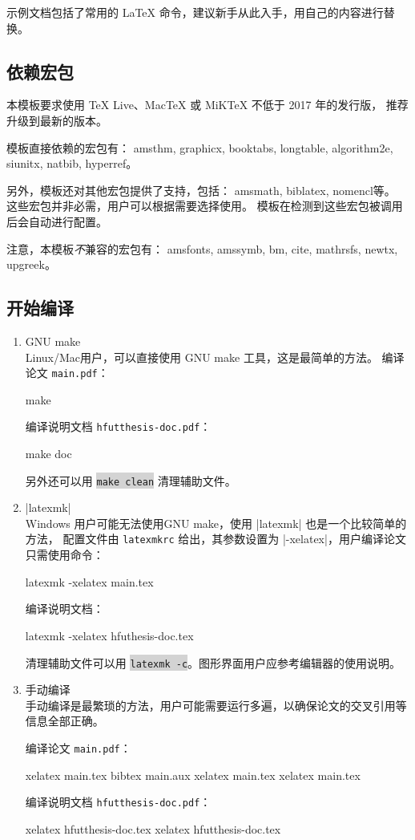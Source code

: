 \documentclass[a4paper]{ltxdoc}
\DeclareRobustCommand\file{\nolinkurl}
\DeclareRobustCommand\pkg{\textsf}
\newcommand\shellcmd[1]{\colorbox{lightgray}{\lstinline[style=lstshell]|#1|}}
\begin{document}
示例文档包括了常用的 \LaTeX{} 命令，建议新手从此入手，用自己的内容进行替换。


\subsection{依赖宏包}

本模板要求使用 TeX Live、MacTeX 或 MiKTeX 不低于 2017 年的发行版，
推荐升级到最新的版本。

模板直接依赖的宏包有：
\pkg{amsthm},
\pkg{graphicx},
\pkg{booktabs},
\pkg{longtable},
\pkg{algorithm2e},
\pkg{siunitx},
\pkg{natbib},
\pkg{hyperref}。

另外，模板还对其他宏包提供了支持，包括：
\pkg{amsmath},
\pkg{biblatex},
\pkg{nomencl}等。
这些宏包并非必需，用户可以根据需要选择使用。
模板在检测到这些宏包被调用后会自动进行配置。

注意，本模板\emph{不}兼容的宏包有：
\pkg{amsfonts},
\pkg{amssymb},
\pkg{bm},
\pkg{cite},
\pkg{mathrsfs},
\pkg{newtx},
\pkg{upgreek}。


\subsection{开始编译}

\begin{enumerate}

\item GNU make \\
Linux/Mac用户，可以直接使用 GNU make 工具，这是最简单的方法。
编译论文 \file{main.pdf}：
\begin{shell}
  make
\end{shell}
编译说明文档 \file{hfutthesis-doc.pdf}：
\begin{shell}
  make doc
\end{shell}
另外还可以用 \shellcmd{make clean} 清理辅助文件。

\item |latexmk| \\
Windows 用户可能无法使用GNU make，使用 |latexmk| 也是一个比较简单的方法，
配置文件由 \file{latexmkrc} 给出，其参数设置为 |-xelatex|，用户编译论文
只需使用命令：
\begin{shell}
  latexmk -xelatex main.tex
\end{shell}
编译说明文档：
\begin{shell}
  latexmk -xelatex hfuthesis-doc.tex
\end{shell}
清理辅助文件可以用 \shellcmd{latexmk -c}。图形界面用户应参考编辑器的使用说明。

\item 手动编译 \\
手动编译是最繁琐的方法，用户可能需要运行多遍，以确保论文的交叉引用等信息全部正确。

编译论文 \file{main.pdf}：
\begin{shell}
  xelatex main.tex
  bibtex main.aux
  xelatex main.tex
  xelatex main.tex
\end{shell}
编译说明文档 \file{hfutthesis-doc.pdf}：
\begin{shell}
  xelatex hfutthesis-doc.tex
  xelatex hfutthesis-doc.tex
\end{shell}
\end{enumerate}
\end{document}
